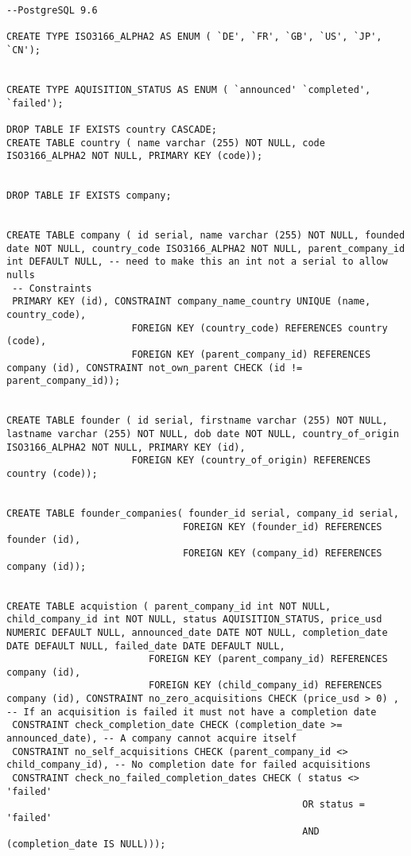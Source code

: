 \documentclass[12pt]{article}
\begin{document}
\begin{verbatim}
--PostgreSQL 9.6

CREATE TYPE ISO3166_ALPHA2 AS ENUM ( `DE', `FR', `GB', `US', `JP', `CN');


CREATE TYPE AQUISITION_STATUS AS ENUM ( `announced' `completed', `failed');

DROP TABLE IF EXISTS country CASCADE;
CREATE TABLE country ( name varchar (255) NOT NULL, code ISO3166_ALPHA2 NOT NULL, PRIMARY KEY (code));


DROP TABLE IF EXISTS company;


CREATE TABLE company ( id serial, name varchar (255) NOT NULL, founded date NOT NULL, country_code ISO3166_ALPHA2 NOT NULL, parent_company_id int DEFAULT NULL, -- need to make this an int not a serial to allow nulls
 -- Constraints
 PRIMARY KEY (id), CONSTRAINT company_name_country UNIQUE (name, country_code),
                      FOREIGN KEY (country_code) REFERENCES country (code),
                      FOREIGN KEY (parent_company_id) REFERENCES company (id), CONSTRAINT not_own_parent CHECK (id != parent_company_id));


CREATE TABLE founder ( id serial, firstname varchar (255) NOT NULL, lastname varchar (255) NOT NULL, dob date NOT NULL, country_of_origin ISO3166_ALPHA2 NOT NULL, PRIMARY KEY (id),
                      FOREIGN KEY (country_of_origin) REFERENCES country (code));


CREATE TABLE founder_companies( founder_id serial, company_id serial,
                               FOREIGN KEY (founder_id) REFERENCES founder (id),
                               FOREIGN KEY (company_id) REFERENCES company (id));


CREATE TABLE acquistion ( parent_company_id int NOT NULL, child_company_id int NOT NULL, status AQUISITION_STATUS, price_usd NUMERIC DEFAULT NULL, announced_date DATE NOT NULL, completion_date DATE DEFAULT NULL, failed_date DATE DEFAULT NULL,
                         FOREIGN KEY (parent_company_id) REFERENCES company (id),
                         FOREIGN KEY (child_company_id) REFERENCES company (id), CONSTRAINT no_zero_acquisitions CHECK (price_usd > 0) , -- If an acquisition is failed it must not have a completion date
 CONSTRAINT check_completion_date CHECK (completion_date >= announced_date), -- A company cannot acquire itself
 CONSTRAINT no_self_acquisitions CHECK (parent_company_id <> child_company_id), -- No completion date for failed acquisitions
 CONSTRAINT check_no_failed_completion_dates CHECK ( status <> 'failed'
                                                    OR status = 'failed'
                                                    AND (completion_date IS NULL)));



\end{verbatim}
\end{document}
